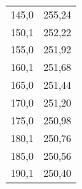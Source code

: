 \documentclass[a4paper, 12pt]{article}
\begin{document}
\begin{table}[hbt!]
\begin{tabular}{|c | c|}
		145,0             & 255,24            \\
		\rowcolor[HTML]{FFFF00} 
		150,1             & 252,22            \\
		155,0             & 251,92            \\
		160,1             & 251,68            \\
		165,0             & 251,44            \\
		170,0             & 251,20            \\
		175,0             & 250,98            \\
		180,1             & 250,76            \\
		185,0             & 250,56            \\
		190,1             & 250,40           \\
		\hline
	\end{tabular}

\end{table}
	
\end{document}
